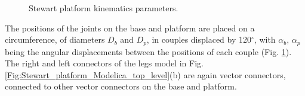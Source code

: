\documentclass[]{interact}
\theoremstyle{plain}%
\theoremstyle{definition}
\theoremstyle{remark}
\begin{document}
{\begin{figure}
\centering
{}\hspace{1cm}
\caption{Stewart platform kinematics parameters.} \label{Fig:Stewart_platform_kinematics_parameters}
\end{figure}
The positions of the joints on the base and platform are placed on a circumference, of diameters $D_b$ and $D_p$, in couples displaced by 120$^\circ$, with $\alpha_b$, $\alpha_p$ being the angular displacements between the positions of each couple (Fig. \ref{Fig:Stewart_platform_kinematics_parameters}). The right and left connectors of the legs model in Fig. \ref{Fig:Stewart_platform_Modelica_top_level}(b) are again vector connectors, connected to other vector connectors on the base and platform.

}
\end{document}
